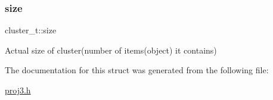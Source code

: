 \subsubsection{\texorpdfstring{size}{size}}
{\footnotesize\ttfamily cluster\+\_\+t\+::size}

Actual size of cluster(number of items(object) it contains) 

The documentation for this struct was generated from the following file\+:\begin{DoxyCompactItemize}
\item 
\mbox{\hyperlink{proj3_8h}{proj3.\+h}}\end{DoxyCompactItemize}
